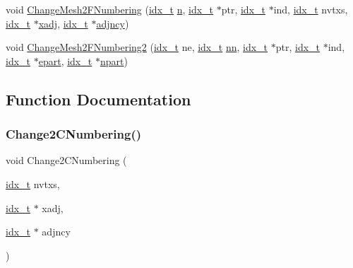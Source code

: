 \begin{DoxyCompactItemize}
\item 
void \hyperlink{a00200_a9ce41505b3d76a92b195e3d94c3f09e8}{Change\+Mesh2\+F\+Numbering} (\hyperlink{a00876_aaa5262be3e700770163401acb0150f52}{idx\+\_\+t} \hyperlink{a00623_a781a04ab095280f838ff3eb0e51312e0}{n}, \hyperlink{a00876_aaa5262be3e700770163401acb0150f52}{idx\+\_\+t} $\ast$ptr, \hyperlink{a00876_aaa5262be3e700770163401acb0150f52}{idx\+\_\+t} $\ast$ind, \hyperlink{a00876_aaa5262be3e700770163401acb0150f52}{idx\+\_\+t} nvtxs, \hyperlink{a00876_aaa5262be3e700770163401acb0150f52}{idx\+\_\+t} $\ast$\hyperlink{a00879_aa8fc7f75458e38e1e2979ed6db639164}{xadj}, \hyperlink{a00876_aaa5262be3e700770163401acb0150f52}{idx\+\_\+t} $\ast$\hyperlink{a00879_a20c068e3ebdd8f9889fb82c1f677d679}{adjncy})
\item 
void \hyperlink{a00200_a60a9b8fb9d30f771f5683615348a2079}{Change\+Mesh2\+F\+Numbering2} (\hyperlink{a00876_aaa5262be3e700770163401acb0150f52}{idx\+\_\+t} ne, \hyperlink{a00876_aaa5262be3e700770163401acb0150f52}{idx\+\_\+t} \hyperlink{a00605_a29f8cac5eb66bce13c51cf794c698f74}{nn}, \hyperlink{a00876_aaa5262be3e700770163401acb0150f52}{idx\+\_\+t} $\ast$ptr, \hyperlink{a00876_aaa5262be3e700770163401acb0150f52}{idx\+\_\+t} $\ast$ind, \hyperlink{a00876_aaa5262be3e700770163401acb0150f52}{idx\+\_\+t} $\ast$\hyperlink{a00879_a3be6f43a8ac8840d4c97578068513c18}{epart}, \hyperlink{a00876_aaa5262be3e700770163401acb0150f52}{idx\+\_\+t} $\ast$\hyperlink{a00879_aa5e2883dfb3577926b3b5842698947bc}{npart})
\end{DoxyCompactItemize}


\subsection{Function Documentation}
\mbox{\label{a00200_a0f7905bc763999e507fa86607deba727}} 
\subsubsection{\texorpdfstring{Change2\+C\+Numbering()}{Change2CNumbering()}}
{\footnotesize\ttfamily void Change2\+C\+Numbering (\begin{DoxyParamCaption}\item[{\hyperlink{a00876_aaa5262be3e700770163401acb0150f52}{idx\+\_\+t}}]{nvtxs,  }\item[{\hyperlink{a00876_aaa5262be3e700770163401acb0150f52}{idx\+\_\+t} $\ast$}]{xadj,  }\item[{\hyperlink{a00876_aaa5262be3e700770163401acb0150f52}{idx\+\_\+t} $\ast$}]{adjncy }\end{DoxyParamCaption})}

